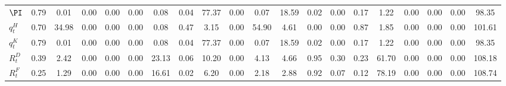 \begin{center}
\begin{longtable}{lccccccccccccccccccc}
$ \PI                       $	 & 	                0.79	 & 	                0.01	 & 	                0.00	 & 	                0.00	 & 	                0.00	 & 	                0.08	 & 	                0.04	 & 	               77.37	 & 	                0.00	 & 	                0.07	 & 	               18.59	 & 	                0.02	 & 	                0.00	 & 	                0.17	 & 	                1.22	 & 	                0.00	 & 	                0.00	 & 	                0.00	 & 	               98.35 \\ 
$ q^H_t                     $	 & 	                0.70	 & 	               34.98	 & 	                0.00	 & 	                0.00	 & 	                0.00	 & 	                0.08	 & 	                0.47	 & 	                3.15	 & 	                0.00	 & 	               54.90	 & 	                4.61	 & 	                0.00	 & 	                0.00	 & 	                0.87	 & 	                1.85	 & 	                0.00	 & 	                0.00	 & 	                0.00	 & 	              101.61 \\ 
$  q^K_t                    $	 & 	                0.79	 & 	                0.01	 & 	                0.00	 & 	                0.00	 & 	                0.00	 & 	                0.08	 & 	                0.04	 & 	               77.37	 & 	                0.00	 & 	                0.07	 & 	               18.59	 & 	                0.02	 & 	                0.00	 & 	                0.17	 & 	                1.22	 & 	                0.00	 & 	                0.00	 & 	                0.00	 & 	               98.35 \\ 
$  R^D_t                    $	 & 	                0.39	 & 	                2.42	 & 	                0.00	 & 	                0.00	 & 	                0.00	 & 	               23.13	 & 	                0.06	 & 	               10.20	 & 	                0.00	 & 	                4.13	 & 	                4.66	 & 	                0.95	 & 	                0.30	 & 	                0.23	 & 	               61.70	 & 	                0.00	 & 	                0.00	 & 	                0.00	 & 	              108.18 \\ 
$ R^F_t                     $	 & 	                0.25	 & 	                1.29	 & 	                0.00	 & 	                0.00	 & 	                0.00	 & 	               16.61	 & 	                0.02	 & 	                6.20	 & 	                0.00	 & 	                2.18	 & 	                2.88	 & 	                0.92	 & 	                0.07	 & 	                0.12	 & 	               78.19	 & 	                0.00	 & 	                0.00	 & 	                0.00	 & 	              108.74 \\ 

\end{longtable}
\end{center}
